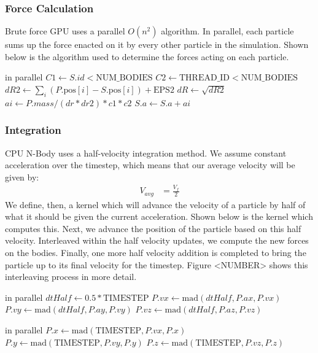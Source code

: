 \documentclass{thesis}
\begin{document}
\subsubsection{Force Calculation}
Brute force GPU uses a parallel $O(n^2)$ algorithm. In parallel, each particle sums up the force enacted on it by every other particle in the simulation. Shown below is the algorithm used to determine the forces acting on each particle.
\begin{algorithmic}
     in parallel
            \State $C1 \gets S.id < \text{NUM\_BODIES}$
            \State $C2 \gets \text{THREAD\_ID} < \text{NUM\_BODIES}$
            \State $dR2 \gets \sum_i (P.\text{pos}[i] - S.\text{pos}[i]) + \text{EPS2}$
            \State $dR \gets \sqrt{dR2}$
            \State $ai \gets P.mass/(dr*dr2) * c1 * c2$
            \State $S.a \gets S.a + ai$ 
        \EndFor
    \EndFor
\end{algorithmic}
\subsubsection{Integration}
CPU N-Body uses a half-velocity integration method. We assume constant acceleration over the timestep, which means that our average velocity will be given by:
\begin{align}
    V_{avg} &= \frac{V_f}{2}
\end{align}
We define, then, a kernel which will advance the velocity of a particle by half of what it should be given the current acceleration. Shown below is the kernel which computes this.
Next, we advance the position of the particle based on this half velocity.
Interleaved within the half velocity updates, we compute the new forces on the bodies. Finally, one more half velocity addition is completed to bring the particle up to its final velocity for the timestep. Figure <NUMBER> shows this interleaving process in more detail.

\begin{algorithmic}
     in parallel
        \State $dtHalf \gets 0.5 * \text{TIMESTEP}$
        \State $P.vx \gets \text{mad}(dtHalf, P.ax, P.vx)$
        \State $P.vy \gets \text{mad}(dtHalf, P.ay, P.vy)$
        \State $P.vz \gets \text{mad}(dtHalf, P.az, P.vz)$
    \EndFor
\end{algorithmic}

\begin{algorithmic}
     in parallel
        \State $P.x \gets \text{mad}(\text{TIMESTEP}, P.vx, P.x)$
        \State $P.y \gets \text{mad}(\text{TIMESTEP}, P.vy, P.y)$
        \State $P.z \gets \text{mad}(\text{TIMESTEP}, P.vz, P.z)$
    \EndFor
\end{algorithmic}
\end{document}
